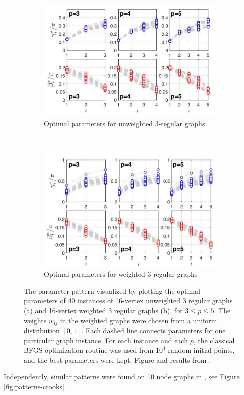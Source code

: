 \begin{figure}[H]
	\centering
	\begin{subfigure}[t]{0.5\textwidth}
		\centering
		\includegraphics[width=\textwidth]{figures/patterns-u3R.jpg}
		\caption{Optimal parameters for unweighted 3-regular graphs}
	\end{subfigure}%
	~ 
	\begin{subfigure}[t]{0.5\textwidth}
		\centering
		\includegraphics[width=\textwidth]{figures/patterns-w3R.jpg}
		\caption{Optimal parameters for weighted 3-regular graphs}
	\end{subfigure}
	\caption{ The parameter pattern visualized by plotting the optimal parameters of 40 instances of 16-vertex unweighted 3 regular graphs (a) and 16-vertex weighted 3 regular graphs (b), for $3 \leq p \leq 5$. The weights $w_{ij}$ in the weighted graphs were chosen from a uniform distribution $[0, 1]$. Each dashed line connects parameters for one particular graph instance. For each instance and each $p$, the classical BFGS optimization routine was used from $10^4$ random initial points, and the best parameters were kept. Figure and results from \cite{ZWCPL18}.}
	\label{fig:patterns-zhou}
\end{figure} 
\newpage
Independently, similar patterns were found on 10 node graphs in \cite{Crooks18}, see Figure \ref{fig:patterns-crooks}.

